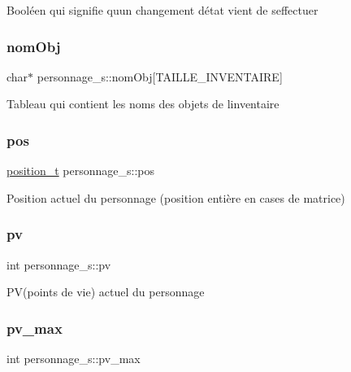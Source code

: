 Booléen qui signifie qu\textquotesingle{}un changement d\textquotesingle{}état vient de s\textquotesingle{}effectuer \mbox{\label{structpersonnage__s_a6fc3c82b6c4f407289aa55155876c867}} 
\subsubsection{\texorpdfstring{nom\+Obj}{nomObj}}
{\footnotesize\ttfamily char$\ast$ personnage\+\_\+s\+::nom\+Obj\mbox{[}T\+A\+I\+L\+L\+E\+\_\+\+I\+N\+V\+E\+N\+T\+A\+I\+RE\mbox{]}}

Tableau qui contient les noms des objets de l\textquotesingle{}inventaire \mbox{\label{structpersonnage__s_adea4789f8b55587ec092f3a32b7b1964}} 
\subsubsection{\texorpdfstring{pos}{pos}}
{\footnotesize\ttfamily \hyperlink{structposition__s}{position\+\_\+t} personnage\+\_\+s\+::pos}

Position actuel du personnage (position entière en cases de matrice) \mbox{\label{structpersonnage__s_ab3090d9110756af454516f939e9f8a86}} 
\subsubsection{\texorpdfstring{pv}{pv}}
{\footnotesize\ttfamily int personnage\+\_\+s\+::pv}

P\+V(points de vie) actuel du personnage \mbox{\label{structpersonnage__s_a0e58c8761de9044ce770f21aa9ada41a}} 
\subsubsection{\texorpdfstring{pv\+\_\+max}{pv\_max}}
{\footnotesize\ttfamily int personnage\+\_\+s\+::pv\+\_\+max}

